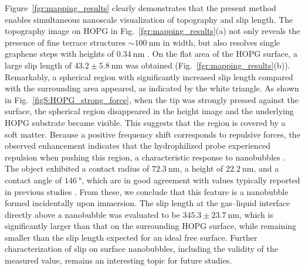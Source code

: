 \documentclass[journal=jacsat,manuscript=article]{achemso}
\begin{document}
Figure~\ref{fgr:mapping_results} clearly demonstrates that the present method enables simultaneous nanoscale visualization of topography and slip length. The topography image on HOPG in Fig.~\ref{fgr:mapping_results}(a) not only reveals the presence of fine terrace structures \(\sim\SI{100}{\nano\metre}\) in width, but also resolves single graphene steps with heights of \(\SI{0.34}{\nano\metre}\) \cite{Franklin1951-hy}. On the flat area of the HOPG surface, a large slip length of \(43.2 \pm \SI{5.8}{\nano\metre}\) was obtained (Fig.~\ref{fgr:mapping_results}(b)). Remarkably, a spherical region with significantly increased slip length compared with the surrounding area appeared, as indicated by the white triangle. As shown in Fig.~\ref{figS:HOPG_strong_force}, when the tip was strongly pressed against the surface, the spherical region disappeared in the height image and the underlying HOPG substrate became visible. This suggests that the region is covered by a soft matter. Because a positive frequency shift corresponds to repulsive forces, the observed enhancement indicates that the hydrophilized probe experienced repulsion when pushing this region, a characteristic response to nanobubbles \cite{Teshima2018-cx, Teshima2020-vr}. The object exhibited a contact radius of \(\SI{72.3}{\nano\metre}\), a height of \(\SI{22.2}{\nano\metre}\), and a contact angle of \(\SI{146}{\degree}\), which are in good agreement with values typically reported in previous studies \cite{Zhang2014-ng, Wang2015-yj}. From these, we conclude that this feature is a nanobubble formed incidentally upon immersion. The slip length at the gas--liquid interface directly above a nanobubble was evaluated to be \(345.3 \pm \SI{23.7}{\nano\meter}\), which is significantly larger than that on the surrounding HOPG surface, while remaining smaller than the slip length expected for an ideal free surface. Further characterization of slip on surface nanobubbles, including the validity of the measured value, remains an interesting topic for future studies.
\end{document}
